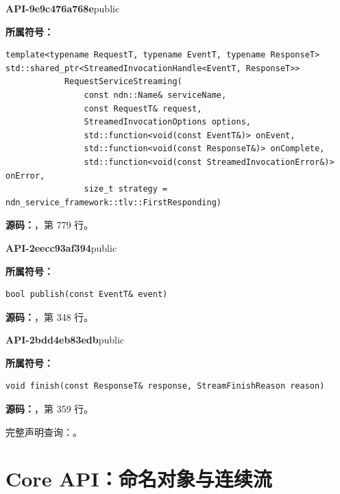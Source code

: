 \textbf{API-9e9c476a768e}\quad public\par
\textbf{所属符号：}\par
\begin{Verbatim}[fontsize=\footnotesize,breaklines,breakanywhere]
template<typename RequestT, typename EventT, typename ResponseT>
std::shared_ptr<StreamedInvocationHandle<EventT, ResponseT>>
            RequestServiceStreaming(
                const ndn::Name& serviceName,
                const RequestT& request,
                StreamedInvocationOptions options,
                std::function<void(const EventT&)> onEvent,
                std::function<void(const ResponseT&)> onComplete,
                std::function<void(const StreamedInvocationError&)> onError,
                size_t strategy = ndn_service_framework::tlv::FirstResponding)
\end{Verbatim}
\textbf{源码：}，第 779 行。\par

\textbf{API-2eecc93af394}\quad public\par
\textbf{所属符号：}\par
\begin{Verbatim}[fontsize=\footnotesize,breaklines,breakanywhere]
bool publish(const EventT& event)
\end{Verbatim}
\textbf{源码：}，第 348 行。\par

\textbf{API-2bdd4eb83edb}\quad public\par
\textbf{所属符号：}\par
\begin{Verbatim}[fontsize=\footnotesize,breaklines,breakanywhere]
void finish(const ResponseT& response, StreamFinishReason reason)
\end{Verbatim}
\textbf{源码：}，第 359 行。\par

完整声明查询：。

\section{Core API：命名对象与连续流}

